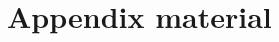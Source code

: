 \documentclass[12pt,preprint]{aastex}
\begin{document}
\appendix

\section{Appendix material}



\end{document}
